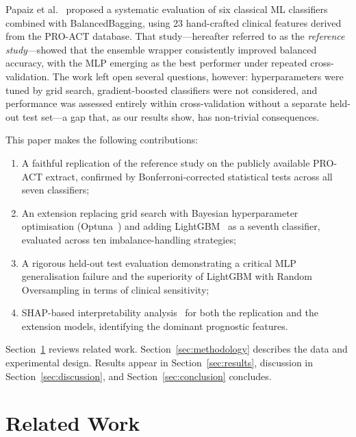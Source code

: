 \documentclass[a4paper,twoside]{article}
\begin{document}
Papaiz et al.~\cite{Papaiz2024} proposed a systematic evaluation of six
classical ML classifiers combined with BalancedBagging, using 23 hand-crafted
clinical features derived from the PRO-ACT database. That study---hereafter
referred to as the \emph{reference study}---showed that the ensemble wrapper
consistently improved balanced accuracy, with the MLP emerging as the best
performer under repeated cross-validation. The work left open several questions,
however: hyperparameters were tuned by grid search, gradient-boosted classifiers
were not considered, and performance was assessed entirely within cross-validation
without a separate held-out test set---a gap that, as our results show, has
non-trivial consequences.

This paper makes the following contributions:
\begin{enumerate}
  \item A faithful replication of the reference study on the publicly available
    PRO-ACT extract, confirmed by Bonferroni-corrected statistical tests across
    all seven classifiers;
  \item An extension replacing grid search with Bayesian hyperparameter
    optimisation (Optuna~\cite{optuna2019}) and adding LightGBM~\cite{ke2017lightgbm}
    as a seventh classifier, evaluated across ten imbalance-handling strategies;
  \item A rigorous held-out test evaluation demonstrating a critical MLP
    generalisation failure and the superiority of LightGBM with Random
    Oversampling in terms of clinical sensitivity;
  \item SHAP-based interpretability analysis~\cite{lundberg2017shap,lundberg2020treeshap} for both the replication and the extension models,
    identifying the dominant prognostic features.
\end{enumerate}

Section~\ref{sec:related} reviews related work. Section~\ref{sec:methodology}
describes the data and experimental design. Results appear in
Section~\ref{sec:results}, discussion in Section~\ref{sec:discussion}, and
Section~\ref{sec:conclusion} concludes.


\section{Related Work}
\label{sec:related}
\end{document}
